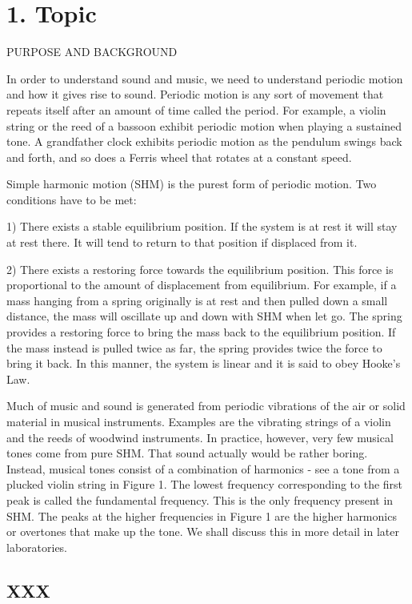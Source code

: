 \documentclass[11pt]{NSF}
\begin{document}
     
\section{1. Topic}

PURPOSE AND BACKGROUND

In order to understand sound and music, we need to understand periodic motion
and how it gives rise to sound. Periodic motion is any sort of movement that
repeats itself after an amount of time called the period. For example, a violin
string or the reed of a bassoon exhibit periodic motion when playing a
sustained tone. A grandfather clock exhibits periodic motion as the pendulum
swings back and forth, and so does a Ferris wheel that rotates at a constant
speed.

Simple harmonic motion (SHM) is the purest form of periodic motion. Two
conditions have to be met:

1) There exists a stable equilibrium position. If the system is at rest it will
stay at rest there. It will tend to return to that position if displaced from
it.

2) There exists a restoring force towards the equilibrium position. This force
is proportional to the amount of displacement from equilibrium. For example, if
a mass hanging from a spring originally is at rest and then pulled down a small
distance, the mass will oscillate up and down with SHM when let go. The spring
provides a restoring force to bring the mass back to the equilibrium position.
If the mass instead is pulled twice as far, the spring provides twice the force
to bring it back. In this manner, the system is linear and it is said to obey
Hooke’s Law.

Much of music and sound is generated from periodic vibrations of the air or
solid material in musical instruments. Examples are the vibrating strings of a
violin and the reeds of woodwind instruments. In practice, however, very few
musical tones come from pure SHM. That sound actually would be rather boring.
Instead, musical tones consist of a combination of harmonics - see a tone from
a plucked violin string in Figure 1. The lowest frequency corresponding to the
first peak is called the fundamental frequency. This is the only frequency
present in SHM. The peaks at the higher frequencies in Figure 1 are the higher
harmonics or overtones that make up the tone. We shall discuss this in more
detail in later laboratories.

\subsection{XXX}
\end{document}
